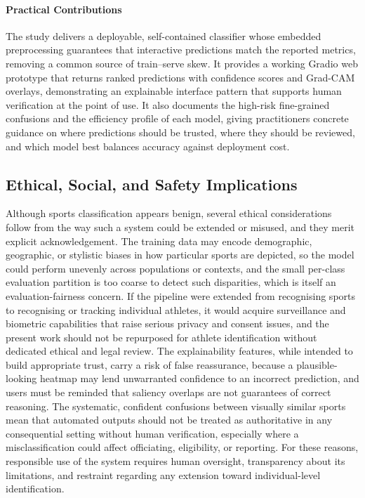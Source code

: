\paragraph{Practical Contributions}
The study delivers a deployable, self-contained classifier whose embedded preprocessing guarantees that interactive predictions match the reported metrics, removing a common source of train--serve skew.
It provides a working Gradio web prototype that returns ranked predictions with confidence scores and Grad-CAM overlays, demonstrating an explainable interface pattern that supports human verification at the point of use.
It also documents the high-risk fine-grained confusions and the efficiency profile of each model, giving practitioners concrete guidance on where predictions should be trusted, where they should be reviewed, and which model best balances accuracy against deployment cost.

\subsection{Ethical, Social, and Safety Implications}
\label{subsec:disc-ethics}

Although sports classification appears benign, several ethical considerations follow from the way such a system could be extended or misused, and they merit explicit acknowledgement.
The training data may encode demographic, geographic, or stylistic biases in how particular sports are depicted, so the model could perform unevenly across populations or contexts, and the small per-class evaluation partition is too coarse to detect such disparities, which is itself an evaluation-fairness concern.
If the pipeline were extended from recognising sports to recognising or tracking individual athletes, it would acquire surveillance and biometric capabilities that raise serious privacy and consent issues, and the present work should not be repurposed for athlete identification without dedicated ethical and legal review.
The explainability features, while intended to build appropriate trust, carry a risk of false reassurance, because a plausible-looking heatmap may lend unwarranted confidence to an incorrect prediction, and users must be reminded that saliency overlaps are not guarantees of correct reasoning.
The systematic, confident confusions between visually similar sports mean that automated outputs should not be treated as authoritative in any consequential setting without human verification, especially where a misclassification could affect officiating, eligibility, or reporting.
For these reasons, responsible use of the system requires human oversight, transparency about its limitations, and restraint regarding any extension toward individual-level identification.

